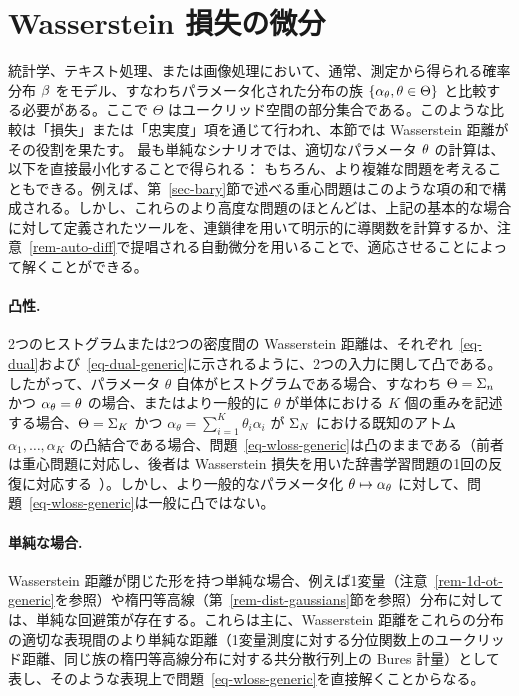 \section{Wasserstein 損失の微分}

統計学、テキスト処理、または画像処理において、通常、測定から得られる確率分布 $\beta$ をモデル、すなわちパラメータ化された分布の族 $\{\alpha_\theta,\theta\in\Theta\}$ と比較する必要がある。ここで $\Theta$ はユークリッド空間の部分集合である。このような比較は「損失」または「忠実度」項を通じて行われ、本節では Wasserstein 距離がその役割を果たす。
最も単純なシナリオでは、適切なパラメータ $\theta$ の計算は、以下を直接最小化することで得られる：
もちろん、より複雑な問題を考えることもできる。例えば、第~\ref{sec-bary}節で述べる重心問題はこのような項の和で構成される。しかし、これらのより高度な問題のほとんどは、上記の基本的な場合に対して定義されたツールを、連鎖律を用いて明示的に導関数を計算するか、注意~\ref{rem-auto-diff}で提唱される自動微分を用いることで、適応させることによって解くことができる。

\paragraph{凸性.} 2つのヒストグラムまたは2つの密度間の Wasserstein 距離は、それぞれ~\eqref{eq-dual}および~\eqref{eq-dual-generic}に示されるように、2つの入力に関して凸である。したがって、パラメータ $\theta$ 自体がヒストグラムである場合、すなわち $\Theta=\Sigma_n$ かつ $\alpha_\theta=\theta$ の場合、またはより一般的に $\theta$ が単体における $K$ 個の重みを記述する場合、$\Theta=\Sigma_K$ かつ $\alpha_\theta=\sum_{i=1}^K \theta_i \alpha_i$ が $\Sigma_N$ における既知のアトム $\alpha_1,\dots,\alpha_K$ の凸結合である場合、問題~\eqref{eq-wloss-generic}は凸のままである（前者は重心問題に対応し、後者は Wasserstein 損失を用いた辞書学習問題の1回の反復に対応する~\citep{pmlr-v51-rolet16}）。しかし、より一般的なパラメータ化 $\theta\mapsto \alpha_\theta$ に対して、問題~\eqref{eq-wloss-generic}は一般に凸ではない。


\paragraph{単純な場合.} Wasserstein 距離が閉じた形を持つ単純な場合、例えば1変量（注意~\ref{rem-1d-ot-generic}を参照）や楕円等高線（第~\ref{rem-dist-gaussians}節を参照）分布に対しては、単純な回避策が存在する。これらは主に、Wasserstein 距離をこれらの分布の適切な表現間のより単純な距離（1変量測度に対する分位関数上のユークリッド距離、同じ族の楕円等高線分布に対する共分散行列上の Bures 計量）として表し、そのような表現上で問題~\eqref{eq-wloss-generic}を直接解くことからなる。


